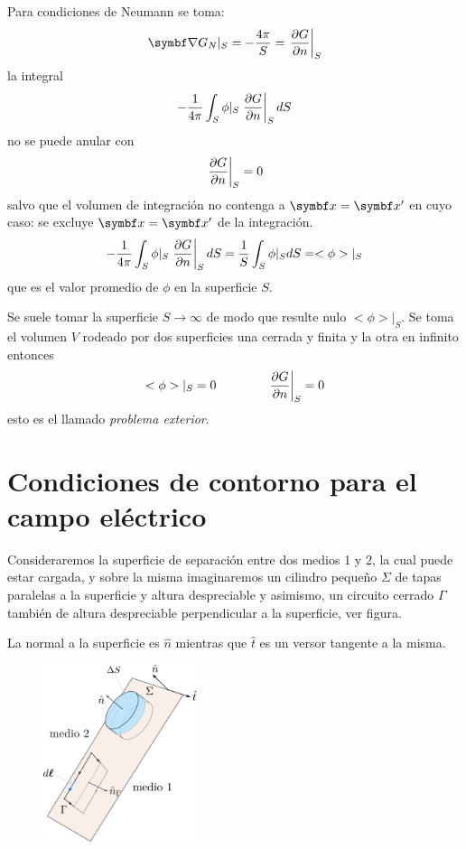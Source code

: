 \documentclass[10pt,oneside]{CBFT_book}
\begin{document}
Para condiciones de Neumann se toma:
\[
	\Nabla G_N|_S = -\frac{4\pi}{S} = \left. \dpar{G}{n} \right|_S
\]
la integral 
\[
	- \frac{1}{4\pi} \int_S \phi|_S \left.\frac{\partial^{\hspace{-0.05em}} {G}}{\partial {n}^{\hspace{-0.05em}}}\right|_S  dS
\]
no se puede anular con 
\[
	\left.\frac{\partial^{\hspace{-0.05em}} {G}}{\partial {n}^{\hspace{-0.05em}}}\right|_S = 0
\]
salvo que el volumen de integración no contenga a $\vb{x}=\vb{x}'$ en cuyo caso:
se excluye $\vb{x}=\vb{x}'$ de la integración.
\[
	- \frac{1}{4\pi} \int_S \phi|_S \left.\frac{\partial^{\hspace{-0.05em}} {G}}{\partial {n}^{\hspace{-0.05em}}}\right|_S  dS =
	\frac{1}{S} \int_S \phi|_S dS = <\phi>|_S
\]
que es el valor promedio de $\phi$ en la superficie $S$.

Se suele tomar la superficie $S \to \infty$ de modo que resulte nulo $<\phi>|_S$.
Se toma el volumen $V$ rodeado por dos superficies una cerrada y finita y la otra
en infinito entonces
\[
	<\phi>|_S = 0 \qquad \qquad \left. \frac{\partial^{\hspace{-0.05em}} {G}}{\partial {n}^{\hspace{-0.05em}}}\right|_S = 0
\]
esto es el llamado {\it problema exterior}.

\section{Condiciones de contorno para el campo eléctrico}

Consideraremos la superficie de separación entre dos medios 1 y 2, la cual puede estar cargada, y sobre
la misma imaginaremos un cilindro pequeño $\Sigma$ de tapas paralelas a la superficie y altura despreciable y 
asimismo, un circuito cerrado $\Gamma$ también de altura despreciable perpendicular a la superficie, ver figura.

La normal a la superficie es $\hat{n}$ mientras que $\hat{t}$ es un versor tangente a la misma.

\begin{figure}[!htb]
	\begin{center}
	\includegraphics[width=0.4\textwidth]{images/fig_ft1_contornos_E.pdf} 
	\end{center}
	\caption{}
\end{figure} 
\end{document}

